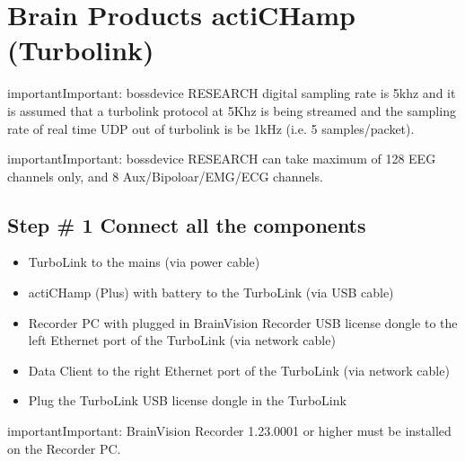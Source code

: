 \documentclass[letterpaper,10pt,english]{sphinxmanual}
\begin{document}
\section{Brain Products actiCHamp (Turbolink)}
\label{\detokenize{3_setup_biosignal_amplifier:brain-products-actichamp-turbolink}}
\begin{sphinxadmonition}{important}{Important:}
\sphinxAtStartPar
bossdevice RESEARCH digital sampling rate is 5khz and it is assumed that a turbolink protocol at 5Khz is being streamed and the sampling rate of real time UDP out of turbolink is be 1kHz (i.e. 5 samples/packet).
\end{sphinxadmonition}

\begin{sphinxadmonition}{important}{Important:}
\sphinxAtStartPar
bossdevice RESEARCH can take maximum of 128 EEG channels only, and 8 Aux/Bipoloar/EMG/ECG channels.
\end{sphinxadmonition}


\subsection{Step \# 1 \sphinxhyphen{} Connect all the components}
\label{\detokenize{3_setup_biosignal_amplifier:step-1-connect-all-the-components}}\begin{itemize}
\item {} 
\sphinxAtStartPar
TurboLink to the mains (via power cable)

\item {} 
\sphinxAtStartPar
actiCHamp (Plus) with battery to the TurboLink (via USB cable)

\item {} 
\sphinxAtStartPar
Recorder PC with plugged in BrainVision Recorder USB license dongle to the left Ethernet port of the TurboLink (via network cable)

\item {} 
\sphinxAtStartPar
Data Client to the right Ethernet port of the TurboLink (via network cable)

\item {} 
\sphinxAtStartPar
Plug the TurboLink USB license dongle in the TurboLink

\end{itemize}

\begin{sphinxadmonition}{important}{Important:}
\sphinxAtStartPar
BrainVision Recorder 1.23.0001 or higher must be installed on the Recorder PC.
\end{sphinxadmonition}
\end{document}
